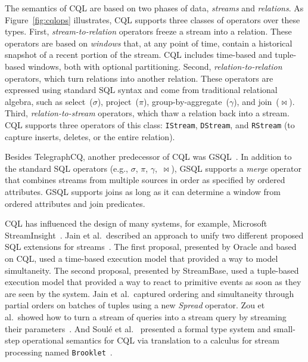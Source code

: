The semantics of CQL are
based on two phases of data, \emph{streams} and \emph{relations}.
As Figure~\ref{fig:cqlops} illustrates, CQL
supports three classes of operators over these types. First,
\emph{stream-to-relation} operators freeze a stream into a relation.
These operators are based on
\emph{windows} that, at any point of time, contain a
historical snapshot of a recent portion of the stream. CQL includes
time-based and tuple-based windows, both with optional
partitioning. Second, \emph{relation-to-relation} operators, which
turn relations into another relation. These operators are expressed
using standard SQL syntax and come from traditional relational
algebra, such as select~($\sigma$), project~($\pi$),
group-by-aggregate~($\gamma$), and join~($\bowtie$).
Third, \emph{rela\-tion-to-stream} operators, which thaw a relation
back into a stream. CQL supports three operators of this class:
\texttt{IStream}, \texttt{DStream}, and \texttt{RStream} (to capture inserts, deletes, or the entire
relation).

Besides TelegraphCQ, another predecessor of CQL was
\textsf{GSQL}~\cite{cranor_et_al_2003}.  In addition to the standard SQL
operators (e.g., $\sigma$, $\pi$, $\gamma$,~$\bowtie$), GSQL supports
a \emph{merge} operator that combines streams from multiple sources in
order as specified by ordered attributes.  GSQL supports joins as long
as it can determine a window from ordered attributes and join predicates.

CQL has influenced the design of many systems, for example, \textsf{Microsoft
StreamInsight}~\cite{ali_et_al_2009}.  Jain et al.\ described an
approach to unify two different proposed SQL extensions for
streams~\cite{jain_et_al_2008}. The first proposal, presented by
Oracle and based on CQL, used a time-based execution model that
provided a way to model simultaneity. The second proposal, presented
by \textsf{StreamBase}, used a tuple-based execution model that provided a way
to react to primitive events as soon as they are seen by the system.
Jain et al.\ captured ordering and simultaneity through partial orders
on batches of tuples using a new \emph{Spread} operator.  Zou et
al.\ showed how to turn a stream of queries into a stream query by
streaming their parameters~\cite{zou_et_al_2010}.  And Soul\'{e} et
al.~\cite{soule_et_al_2016} presented a formal type system and
small-step operational semantics for CQL via translation to a calculus
for stream processing named \texttt{Brooklet}~\cite{soule_et_al_2010}.
